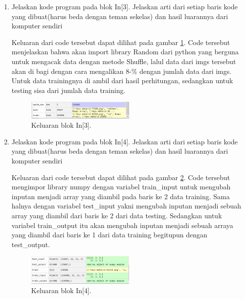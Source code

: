 \begin{enumerate}
\item Jelaskan kode program pada blok In[3]. Jelaskan arti dari setiap baris kode yang dibuat(harus beda dengan teman sekelas) dan hasil luarannya dari komputer sendiri \par

Keluaran dari code tersebut dapat dilihat pada gambar \ref{math3}. Code tersebut menjelaskan bahwa akan import library Random dari python yang berguna untuk mengacak data dengan metode Shuffle, lalul data dari imgs tersebut akan di bagi dengan cara mengalikan 8-\% dengan jumlah data dari imgs. Untuk data trainingnya di ambil dari hasil perhitungan, sedangkan untuk testing sisa dari jumlah data training.
		\begin{figure}[!htbp]
		\centerline{\includegraphics[width=0.5\textwidth]{figures/im/math3.png}}
		\caption{Keluaran blok In[3].}
		\label{math3}
		\end{figure}

\item Jelaskan kode program pada blok In[4]. Jelaskan arti dari setiap baris kode yang dibuat(harus beda dengan teman sekelas) dan hasil luarannya dari komputer sendiri \par

Keluaran dari code tersebut dapat dilihat pada gambar \ref{math4}. Code tersebut mengimpor library numpy  dengan variabel train\_input untuk mengubah inputan menjadi array yang diambil pada baris ke 2 data training. Sama halnya dengan variabel test\_input yakni mengubah inputan menjadi sebuah array yang diambil dari baris ke 2 dari data testing. Sedangkan untuk variabel train\_output itu akan mengubah inputan menjadi sebuah arraya yang diambil dari baris ke 1 dari data training begitupun dengan test\_output.
		\begin{figure}[!htbp]
		\centerline{\includegraphics[width=0.5\textwidth]{figures/im/math4.png}}
		\caption{Keluaran blok In[4].}
		\label{math4}
		\end{figure}


\end{enumerate}
